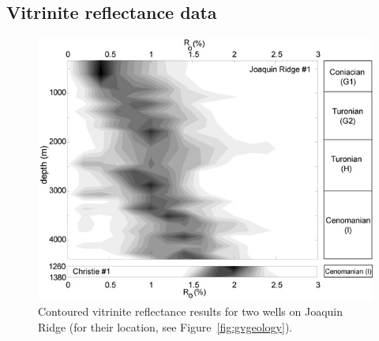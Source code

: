 \documentclass[11pt,twoside]{article}
\begin{document}
\subsection*{Vitrinite reflectance data}

\begin{figure}[here]
  \centering
  \includegraphics[width=400pt]{Vitrinite.jpg}
  \caption{
  Contoured  vitrinite reflectance  results for  two wells  on Joaquin
  Ridge (for their location, see Figure~\ref{fig:gvgeology}).}
  \label{fig:vitrinite}
\end{figure}
\end{document}
